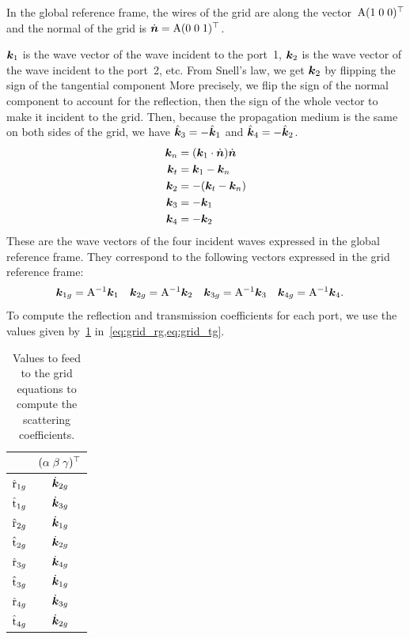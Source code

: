 In the global reference frame, the wires of the grid are along the
vector~$\mathrm{A} (1 \; 0 \; 0)^\top$
and the normal of the grid is $\dot{\bm{n}} = \mathrm{A} (0 \; 0 \; 1)^\top$.

$\bm{k}_1$ is the wave vector of the wave incident to the port~1,
$\bm{k}_2$ is the wave vector of the wave incident to the port~2, etc.
From Snell's law, we get $\bm{k}_2$ by flipping the sign of the tangential component
More precisely, we flip the sign of the normal component to account for the reflection, then the sign of the whole vector to make it incident to the grid.
Then, because the propagation medium is the same on both sides of the grid, we have
$\hat{\bm{k}}_3 = -\hat{\bm{k}}_1$ and
$\hat{\bm{k}}_4 = -\hat{\bm{k}}_2$.
\begin{align}
    \bm{k}_n &= (\bm{k}_1 \cdot \dot{\bm{n}}) \dot{\bm{n}} \\
    \bm{k}_t &= \bm{k}_1 - \bm{k}_n                \\
    \bm{k}_2 &= -(\bm{k}_t - \bm{k}_n)             \\
    \bm{k}_3 &= -\bm{k}_1                            \\
    \bm{k}_4 &= -\bm{k}_2
\end{align}
These are the wave vectors of the four incident waves expressed in the global reference frame.
They correspond to the following vectors expressed in the grid reference frame:
\begin{align}
    \bm{k}_{1g} &= \mathrm{A}^{-1} \bm{k}_1 &
    \bm{k}_{2g} &= \mathrm{A}^{-1} \bm{k}_2 &
    \bm{k}_{3g} &= \mathrm{A}^{-1} \bm{k}_3 &
    \bm{k}_{4g} &= \mathrm{A}^{-1} \bm{k}_4
    \text{.}
\end{align}
To compute the reflection and transmission coefficients for each port, we use the values given by~\cref{tab:grid_values}
in~\cref{eq:grid_rg,eq:grid_tg}.
\begin{table}[hbtp]
    \centering
    \begin{tabular}{cc}
        \toprule
                          & $(\alpha \; \beta \; \gamma)^\top$ \\
        \midrule
        $\hat{\mathrm{r}}_{1g}$ & $\dot{\bm{k}}_{2g}$ \\
        $\hat{\mathrm{t}}_{1g}$ & $\dot{\bm{k}}_{3g}$ \\
        $\hat{\mathrm{r}}_{2g}$ & $\dot{\bm{k}}_{1g}$ \\
        $\hat{\mathrm{t}}_{2g}$ & $\dot{\bm{k}}_{2g}$ \\
        $\hat{\mathrm{r}}_{3g}$ & $\dot{\bm{k}}_{4g}$ \\
        $\hat{\mathrm{t}}_{3g}$ & $\dot{\bm{k}}_{1g}$ \\
        $\hat{\mathrm{r}}_{4g}$ & $\dot{\bm{k}}_{3g}$ \\
        $\hat{\mathrm{t}}_{4g}$ & $\dot{\bm{k}}_{2g}$ \\
        \bottomrule
    \end{tabular}
    \caption{
        Values to feed to the grid equations to compute the scattering coefficients.
    }
    \label{tab:grid_values}
\end{table}

